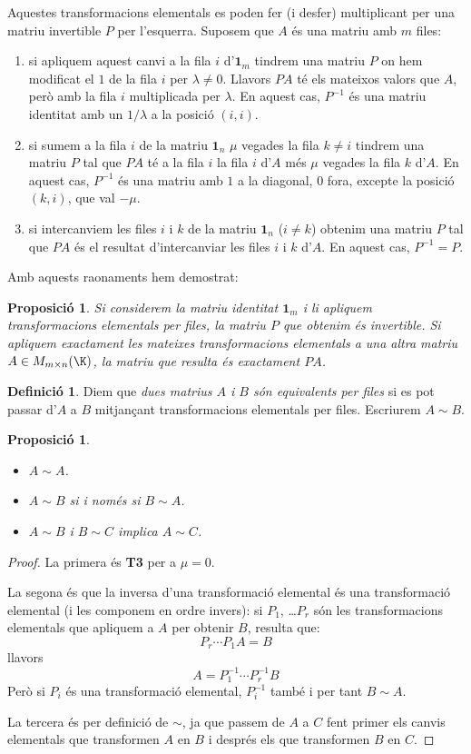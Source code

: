 \documentclass[a4paper,12pt,twoside]{article}
\newcommand{\1}{\mathbf{1}}
\newcommand{\0}{\mathbf{0}}
\newtheorem{proposicio}[teorema]{Proposició}
\theoremstyle{definition}
\newtheorem{definicio}[teorema]{Definició}
\theoremstyle{remark}
\begin{document}
Aquestes transformacions elementals es poden fer (i desfer) multiplicant per una matriu invertible $P$ per l'esquerra. Suposem que $A$ és una matriu amb $m$ files:
\begin{enumerate}[\bf T1.]
	\item si apliquem aquest canvi a la fila $i$ d'$\1_m$ tindrem una matriu $P$ on hem modificat el $1$ de la fila $i$ per $\lambda\neq 0$. Llavors $PA$ té els mateixos valors que $A$, però amb la fila $i$ multiplicada per $\lambda$. En aquest cas, $P^{-1}$ és una matriu identitat amb un $1/\lambda$ a la posició $(i,i)$.
	\item si sumem a la fila $i$ de la matriu $\1_n$ $\mu$ vegades la fila $k\neq i$ tindrem una matriu $P$ tal que $PA$ té a la fila $i$ la fila $i$ d'$A$ més $\mu$ vegades la fila $k$ d'$A$. En aquest cas, $P^{-1}$ és una matriu amb $1$ a la diagonal, $0$ fora, excepte la posició $(k,i)$, que val $-\mu$.
	\item si intercanviem les files $i$ i $k$ de la matriu $\1_n$ ($i\neq k$) obtenim una matriu $P$ tal que $PA$ és el resultat d'intercanviar les files $i$ i $k$ d'$A$. En aquest cas, $P^{-1}=P$.
\end{enumerate}
Amb aquests raonaments hem demostrat:
\begin{proposicio}
	Si considerem la matriu identitat $\1_m$ i li apliquem transformacions elementals per files, la matriu $P$ que obtenim és invertible. Si apliquem exactament les mateixes transformacions elementals a una altra matriu $A\in M_{m\times n}(\K)$, la matriu que resulta és exactament $PA$.
\end{proposicio}
\begin{definicio}
	Diem que \emph{dues matrius $A$ i $B$ són equivalents per files} si es pot passar d'$A$ a $B$ mitjançant transformacions elementals per files. Escriurem $A \sim B$.
\end{definicio}
\begin{proposicio}
	\begin{itemize}
		\item $A \sim A$.
		\item $A \sim B$ si i només si $B \sim A$.
		\item $A \sim B$ i $B \sim C$ implica $A \sim C$.
	\end{itemize}
\end{proposicio}
\begin{proof}
	La primera és \textbf{T3} per a $\mu=0$. 
	
	La segona és que la inversa d'una transformació elemental és una transformació elemental (i les componem en ordre invers): si $P_1$, \dots $P_r$ són les transformacions elementals que apliquem a $A$ per obtenir $B$, resulta que:
	$$
	P_r \cdots P_1 A=B
	$$
	llavors
	$$
	A= P_1^{-1} \cdots P_r^{-1} B
	$$
	Però si $P_i$ és una transformació elemental, $P_i^{-1}$ també i per tant $B\sim A$.
	
	La tercera és per definició de $\sim$, ja que passem de $A$ a $C$ fent primer els canvis elementals que transformen $A$ en $B$ i després els que transformen $B$ en $C$.
\end{proof}
\end{document}
